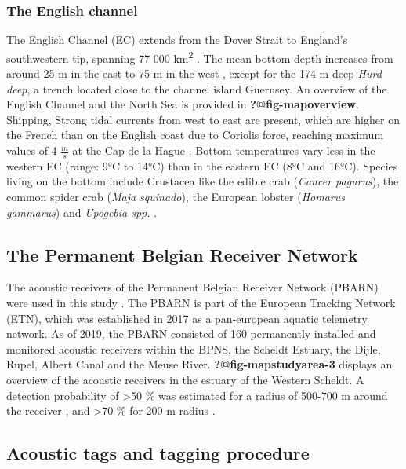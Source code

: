\documentclass[
  authoryear,
  review,
  3p]{elsarticle}
\begin{document}
\hypertarget{sec-mmstudyareaec}{%
\subsubsection{The English channel}\label{sec-mmstudyareaec}}

The English Channel (EC) extends from the Dover Strait to England's
southwestern tip, spanning 77 000 km\textsuperscript{2}
\citep{dauvin_2012}. The mean bottom depth increases from around 25 m in
the east to 75 m in the west \citep{dauvin_2012}, except for the 174 m
deep \emph{Hurd deep}, a trench located close to the channel island
Guernsey. An overview of the English Channel and the North Sea is
provided in \textbf{?@fig-mapoverview}. Shipping, Strong tidal currents
from west to east are present, which are higher on the French than on
the English coast due to Coriolis force, reaching maximum values of 4
\(\frac{m}{s}\) at the Cap de la Hague \citep{salomon_1993}. Bottom
temperatures vary less in the western EC (range: 9°C to 14°C) than in
the eastern EC (8°C and 16°C). Species living on the bottom include
Crustacea like the edible crab (\emph{Cancer pagurus}), the common
spider crab (\emph{Maja squinado}), the European lobster (\emph{Homarus
gammarus}) and \emph{Upogebia spp.} \citep{holme_1966, vaz_2007}.

\hypertarget{the-permanent-belgian-receiver-network}{%
\subsection{The Permanent Belgian Receiver
Network}\label{the-permanent-belgian-receiver-network}}

The acoustic receivers of the Permanent Belgian Receiver Network (PBARN)
were used in this study \citep{reubens_2018}. The PBARN is part of the
European Tracking Network (ETN), which was established in 2017 as a
pan-european aquatic telemetry network. As of 2019, the PBARN consisted
of 160 permanently installed and monitored acoustic receivers within the
BPNS, the Scheldt Estuary, the Dijle, Rupel, Albert Canal and the Meuse
River. \textbf{?@fig-mapstudyarea-3} displays an overview of the
acoustic receivers in the estuary of the Western Scheldt. A detection
probability of \textgreater50 \% was estimated for a radius of 500-700 m
around the receiver \citep{goossens_2022}, and \textgreater70 \% for 200
m radius \citep{reubens_2018}.

\hypertarget{acoustic-tags-and-tagging-procedure}{%
\subsection{Acoustic tags and tagging
procedure}\label{acoustic-tags-and-tagging-procedure}}
\end{document}
